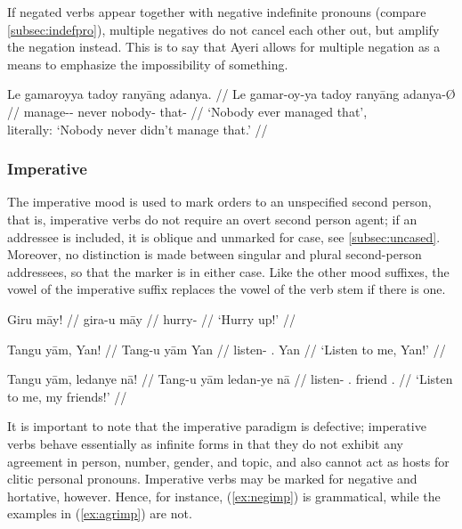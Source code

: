 If negated verbs appear together with negative indefinite pronouns (compare 
\autoref{subsec:indefpro}), multiple negatives do not cancel each other out, 
but amplify the negation instead. This is to say that Ayeri allows for multiple
negation as a means to emphasize the 
impossibility of something.

\ex
\begingl
	\gla Le gamaroyya tadoy ranyāng adanya. //
	\glb Le gamar-oy-ya tadoy ranyāng adanya-Ø //
	\glc \PatTI{} manage-\Neg{}-\TsgM{} never nobody-\Aarg{} that-\Top{} //
	\glft `Nobody ever managed that',\\
		literally: `Nobody never didn't manage that.' //
\endgl
\xe


\subsubsection{Imperative}

The imperative mood is used to mark orders to an unspecified second person,
that is, imperative verbs do not require an overt second person agent; if an
addressee is included, it is oblique and unmarked for case, see
\autoref{subsec:uncased}. Moreover, no distinction is made between singular and
plural second-person addressees, so that the marker is  in either
case. Like the other mood suffixes, the vowel of the imperative suffix replaces
the vowel of the verb stem if there is one.

\pex
\a\begingl
	\gla Giru māy! //
	\glb gira-u māy //
	\glc hurry-\Imp{} \Int{} //
	\glft `Hurry up!' //
\endgl

\a\begingl
	\gla Tangu yām, Yan! //
	\glb Tang-u yām Yan //
	\glc listen-\Imp{} \Fsg{}.\Dat{} Yan //
	\glft `Listen to me, Yan!' //
\endgl

\a\begingl
	\gla Tangu yām, ledanye nā! //
	\glb Tang-u yām ledan-ye nā //
	\glc listen-\Imp{} \Fsg{}.\Dat{} friend \Fsg{}.\Gen{} //
	\glft `Listen to me, my friends!' //
\endgl

\xe

It is important to note that the imperative paradigm is defective; imperative 
verbs behave essentially as infinite forms in that they do not exhibit any 
agreement in person, number, gender, and topic, and also cannot act as hosts 
for clitic personal pronouns. Imperative verbs may be marked for negative and 
hortative, however. Hence, for instance, (\ref{ex:negimp}) is grammatical, 
while the examples in (\ref{ex:agrimp}) are not.

